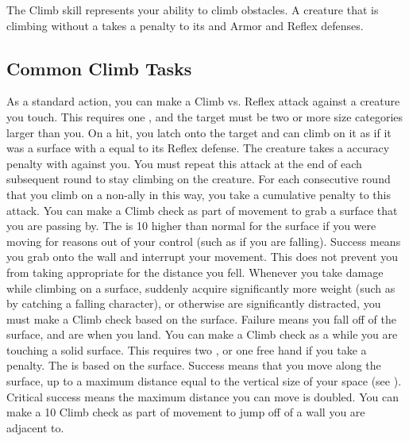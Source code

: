 \newpage
{}
  The Climb skill represents your ability to climb obstacles.
  A creature that is climbing without a  takes a  penalty to its  and Armor and Reflex defenses.

  \subsection{Common Climb Tasks}
     As a standard action, you can make a Climb vs. Reflex attack against a creature you touch.
    This requires one , and the target must be two or more size categories larger than you.
    On a hit, you latch onto the target and can climb on it as if it was a surface with a  equal to its Reflex defense.
    The creature takes a  accuracy penalty with  against you.
    You must repeat this attack at the end of each subsequent round to stay climbing on the creature.
    For each consecutive round that you climb on a non-ally in this way, you take a cumulative  penalty to this attack.
     You can make a Climb check as part of movement to grab a surface that you are passing by.
    The  is 10 higher than normal for the surface if you were moving for reasons out of your control (such as if you are falling).
    Success means you grab onto the wall and interrupt your movement.
    This does not prevent you from taking  appropriate for the distance you fell.
     Whenever you take damage while climbing on a surface, suddenly acquire significantly more weight (such as by catching a falling character), or otherwise are significantly distracted, you must make a Climb check based on the surface.
    Failure means you fall off of the surface, and are \prone when you land.
     You can make a Climb check as a  while you are touching a solid surface.
    This requires two , or one free hand if you take a  penalty.
    The  is based on the surface.
    Success means that you move along the surface, up to a maximum distance equal to the vertical size of your space (see ).
    Critical success means the maximum distance you can move is doubled.
     You can make a  10 Climb check as part of movement to jump off of a wall you are adjacent to.
